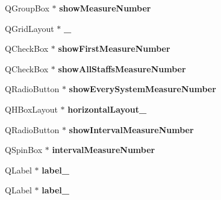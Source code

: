 \begin{DoxyCompactItemize}
\item 
\mbox{\label{class_ui___edit_style_base_a303b9f48dbe6e60477b4f530ac49253b}} 
Q\+Group\+Box $\ast$ {\bfseries show\+Measure\+Number}
\item 
\mbox{\label{class_ui___edit_style_base_aef5533a005a832ac849fa0a6690b5363}} 
Q\+Grid\+Layout $\ast$ {\bfseries \+\_}
\item 
\mbox{\label{class_ui___edit_style_base_a66d228032be20ad437c1626c9d36aab9}} 
Q\+Check\+Box $\ast$ {\bfseries show\+First\+Measure\+Number}
\item 
\mbox{\label{class_ui___edit_style_base_ae093596e264e6563ac005ce1829ed039}} 
Q\+Check\+Box $\ast$ {\bfseries show\+All\+Staffs\+Measure\+Number}
\item 
\mbox{\label{class_ui___edit_style_base_a7e99bcd5d88c99caa5b2426dc29174a2}} 
Q\+Radio\+Button $\ast$ {\bfseries show\+Every\+System\+Measure\+Number}
\item 
\mbox{\label{class_ui___edit_style_base_ab6e23fe93545b37ec6ab788d3ee54224}} 
Q\+H\+Box\+Layout $\ast$ {\bfseries horizontal\+Layout\+\_}
\item 
\mbox{\label{class_ui___edit_style_base_a561aeccdd115ba7c8454d3c4a94fd8b4}} 
Q\+Radio\+Button $\ast$ {\bfseries show\+Interval\+Measure\+Number}
\item 
\mbox{\label{class_ui___edit_style_base_a983a6dfc0b97898cd61536afc8e422a0}} 
Q\+Spin\+Box $\ast$ {\bfseries interval\+Measure\+Number}
\item 
\mbox{\label{class_ui___edit_style_base_a6ca646b921b7d6a4b98f81653352b602}} 
Q\+Label $\ast$ {\bfseries label\+\_}
\item 
\mbox{\label{class_ui___edit_style_base_a59b9aa5d79d5db6093bbbcc04c264b9e}} 
Q\+Label $\ast$ {\bfseries label\+\_}
\item 

\end{DoxyCompactItemize}
